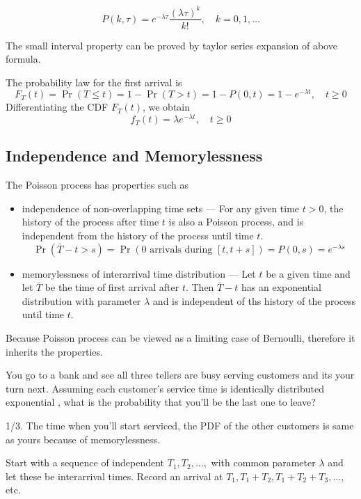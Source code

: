 \[\boxed{P(k, \tau)=e^{-\lambda\tau}\frac{(\lambda\tau)^k}{k!}, \quad k=0,1,\ldots}\]

\begin{remark}
    The small interval property can be proved by taylor series expansion of above formula.
\end{remark}

The probability law for the first arrival is
\[F_T(t)=\Pr(T\le t)=1-\Pr(T>t)=1-P(0,t)=1-e^{-\lambda t}, \quad t\ge 0\]
Differentiating the CDF $F_T(t)$, we obtain
\[\boxed{f_T(t)=\lambda e^{-\lambda t}, \quad t\ge 0}\]

\subsection{Independence and Memorylessness}
The Poisson process has properties such as
\begin{itemize}
    \item independence of non-overlapping time sets --- For any given time $t>0$, the history of the process after time $t$ is also a Poisson process, and is independent from the history of the process until time $t$.
    \[\Pr(\bar T-t>s)=\Pr(0 \text{ arrivals during }[t,t+s])=P(0,s)=e^{-\lambda s}\]
    \item memorylessness of interarrival time distribution --- Let $t$ be a given time and let $\bar T$ be the time of first arrival after $t$. Then $\bar T -t$ has an exponential distribution with parameter $\lambda$ and is independent of ths history of the process until time $t$.
\end{itemize}
Because Poisson process can be viewed as a limiting case of Bernoulli, therefore it inherits the properties.

\begin{example}[Independence]
    You go to a bank and see all three tellers are busy serving customers and its your turn next. Assuming each customer's service time is identically distributed exponential \rv, what is the probability that you'll be the last one to leave?

    1/3. The time when you'll start serviced, the PDF of the other customers is same as yours because of memorylessness.
\end{example}

\begin{definition}
    Start with a sequence of independent \rv $T_1, T_2,\ldots,$ with common parameter $\lambda$ and let these be interarrival times. Record an arrival at $T_1, T_1+T_2, T_1+T_2+T_3,\ldots$, etc.
\end{definition}

